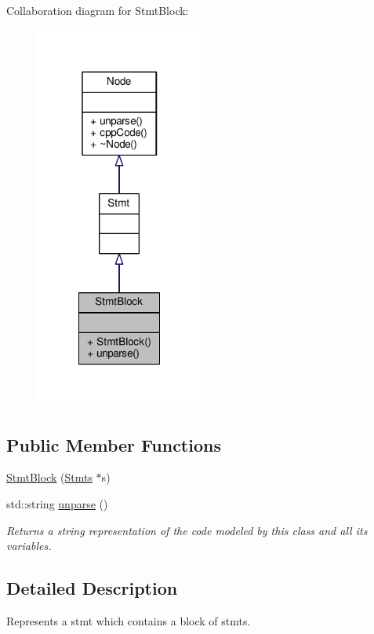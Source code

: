 Collaboration diagram for Stmt\-Block\-:\nopagebreak
\begin{figure}[H]
\begin{center}
\leavevmode
\includegraphics[width=156pt]{classStmtBlock__coll__graph}
\end{center}
\end{figure}
\subsection*{Public Member Functions}
\begin{DoxyCompactItemize}
\item 
\hyperlink{classStmtBlock_a39f3e892234079b85a648159b1255fcf}{Stmt\-Block} (\hyperlink{classStmts}{Stmts} $\ast$s)
\item 
std\-::string \hyperlink{classStmtBlock_add948dedcbf091739307aa977f0a027e}{unparse} ()
\begin{DoxyCompactList}\small\item\em Returns a string representation of the code modeled by this class and all its variables. \end{DoxyCompactList}\end{DoxyCompactItemize}


\subsection{Detailed Description}
Represents a stmt which contains a block of stmts. \par
 


